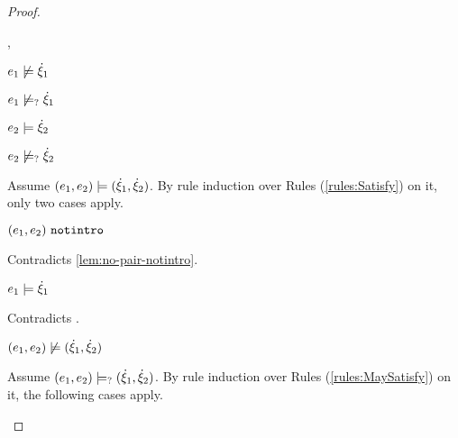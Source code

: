 \begin{proof}
\begin{byCases}
\begin{byCases}
\begin{byCases}
        \item[\cnotsatisfyormay{e_1}{\hxi_1},\csatisfy{e_2}{\hxi_2}]
            \begin{pfsteps*}
            \item $e_1 \not\models \dot{\xi}_1$  
            \item $e_1 \not\models_{?} \dot{\xi}_1$  
            \item $e_2 \models \dot{\xi}_2$  
            \item $e_2 \not\models_{?} \dot{\xi}_2$  
            \end{pfsteps*}
            Assume $(e_1 , e_2) \models (\dot{\xi}_1 , \dot{\xi}_2)$. By rule induction over Rules (\ref{rules:Satisfy}) on it, only two cases apply. 
           \begin{byCases}
            \item[\text{(\ref{rule:CSNotIntroPair})}]
                \begin{pfsteps*}
                \item $(e_1 , e_2) ~\mathtt{notintro}$ 
                \end{pfsteps*}
                Contradicts \autoref{lem:no-pair-notintro}.
            \item[\text{(\ref{rule:CSPair})}]
                \begin{pfsteps*}
                \item $e_1 \models \dot{\xi}_1$ 
                \end{pfsteps*}
                Contradicts .
            \end{byCases}
            \begin{pfsteps*}
            \item $(e_1 , e_2) \not\models (\dot{\xi}_1 , \dot{\xi}_2)$  
            \end{pfsteps*}
            Assume $(e_1 , e_2) \models_{?} (\dot{\xi}_1 , \dot{\xi}_2)$. By rule induction over Rules (\ref{rules:MaySatisfy}) on it, the following cases apply.
            \begin{byCases}
            \item[\text{(\ref{rule:CMSNotIntro})}]

\end{byCases}
\end{byCases}
\end{byCases}
\end{byCases}
\end{proof}
